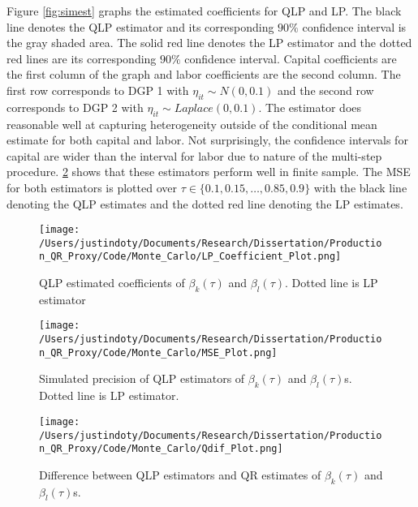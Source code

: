 \documentclass[11pt]{article}
\begin{document}
Figure \ref{fig:simest} graphs the estimated coefficients for QLP and LP. The black line denotes the QLP estimator and its corresponding $90\%$ confidence interval is the gray shaded area. The solid red line denotes the LP estimator and the dotted red lines are its corresponding $90\%$ confidence interval. Capital coefficients are the first column of the graph and labor coefficients are the second column. The first row corresponds to DGP 1 with $\eta_{it}\sim N(0,0.1)$ and the second row corresponds to DGP 2 with $\eta_{it}\sim Laplace(0,0.1)$. The estimator does reasonable well at capturing heterogeneity outside of the conditional mean estimate for both capital and labor. Not surprisingly, the confidence intervals for capital are wider than the interval for labor due to nature of the multi-step procedure. \ref{fig:MSE}  shows that these estimators perform well in finite sample. The MSE for both estimators is plotted over $\tau\in\{0.1, 0.15, \dots, 0.85, 0.9\}$ with the black line denoting the QLP estimates and the dotted red line denoting the LP estimates.

\begin{figure}[ht] 
\centering
\caption{QLP estimated coefficients of  $\beta_{k}(\tau)$ and $\beta_{l}(\tau)$. Dotted line is LP estimator}
\label{fig:simest}
\texttt{[image: /Users/justindoty/Documents/Research/Dissertation/Production\_QR\_Proxy/Code/Monte\_Carlo/LP\_Coefficient\_Plot.png]}
\label{LP_coefficient_plot}
\end{figure}



\begin{figure}[ht]
\centering
\caption{Simulated precision of  QLP estimators of $\beta_{k}(\tau)$ and $\beta_{l}(\tau)$s. Dotted line is LP estimator.}
\texttt{[image: /Users/justindoty/Documents/Research/Dissertation/Production\_QR\_Proxy/Code/Monte\_Carlo/MSE\_Plot.png]}
\label{fig:MSE}
\end{figure}

\begin{figure}[ht]
\centering
\caption{Difference between QLP estimators and QR estimates of $\beta_{k}(\tau)$ and $\beta_{l}(\tau)$s.}
\texttt{[image: /Users/justindoty/Documents/Research/Dissertation/Production\_QR\_Proxy/Code/Monte\_Carlo/Qdif\_Plot.png]}
\label{fig:QDIF}
\end{figure}
\end{document}
